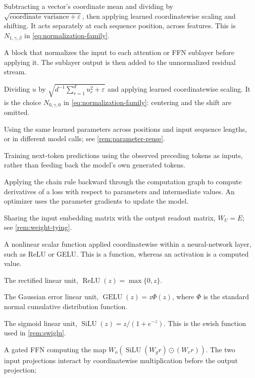 \documentclass[11pt,twoside]{article}
\theoremstyle{plain}
\theoremstyle{definition}
\theoremstyle{remark}
\begin{document}
\begin{description}[style=nextline,leftmargin=1.5em,labelindent=0pt]
Subtracting a vector's coordinate mean and dividing by
$\sqrt{\text{coordinate variance}+\varepsilon}$, then applying learned
coordinatewise scaling and shifting. It acts separately at each sequence
position, across features. This is $N_{1,\gamma,\beta}$ in
\cref{eq:normalization-family}.
\item[Pre-normalized block]
A block that normalizes the input to each attention or FFN
sublayer before applying it. The sublayer output is then added to the
unnormalized residual stream.
\item[Root-mean-square normalization (RMSNorm)]
Dividing $u$ by $\sqrt{d^{-1}\sum_{r=1}^d u_r^2+\varepsilon}$ and applying
learned coordinatewise scaling. It is the choice $N_{0,\gamma,0}$ in
\cref{eq:normalization-family}: centering and the shift are omitted.
\item[Parameter sharing]
Using the same learned parameters across positions and input sequence lengths,
or in different model calls; see \cref{rem:parameter-reuse}.
\item[Teacher forcing]
Training next-token predictions using the observed preceding tokens as
inputs, rather than feeding back the model's own generated tokens.
\item[Backpropagation]
Applying the chain rule backward through the computation graph to compute
derivatives of a loss with respect to parameters and intermediate values.
An optimizer uses the parameter gradients to update the model.
\item[Weight tying]
Sharing the input embedding matrix with the output readout matrix,
$W_U=E$; see \cref{rem:weight-tying}.
\item[Activation function]
A nonlinear scalar function applied coordinatewise within a neural-network
layer, such as ReLU or GELU. This is a function, whereas an activation is a
computed value.
\item[ReLU]
The rectified linear unit, $\operatorname{ReLU}(z)=\max\{0,z\}$.
\item[GELU]
The Gaussian error linear unit, $\operatorname{GELU}(z)=z\Phi(z)$, where
$\Phi$ is the standard normal cumulative distribution function.
\item[SiLU; swish]
The sigmoid linear unit, $\operatorname{SiLU}(z)=z/(1+e^{-z})$.
This is the swish function used in \cref{rem:swiglu}.
\item[SwiGLU]
A gated FFN computing the map
$W_o(\operatorname{SiLU}(W_g r)\odot(W_v r))$. The two input projections
interact by coordinatewise multiplication before the output projection;

\end{description}
\end{document}
